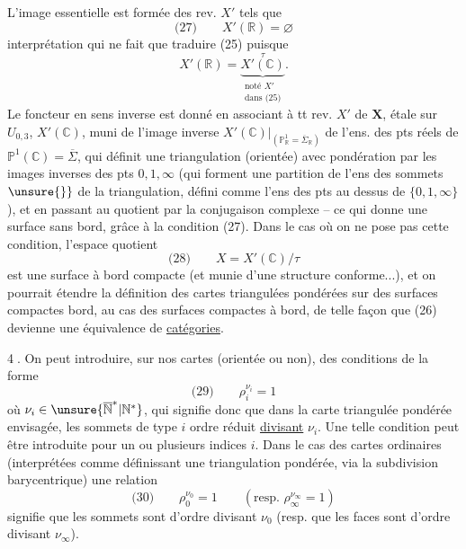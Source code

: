 L'image essentielle est formée des rev. $X'$ tels que 
\[
\text{(27)}\qquad X'(\mathbb R)=\varnothing
\]
interprétation qui ne fait que traduire (25) puisque
\[
X'(\mathbb R)=\underbrace{X'(\mathbb C)}_{\substack{\text{noté }X'\\\text{dans (25)}}}^{\tau}.
\]
Le foncteur en sens inverse est donné en associant à tt rev.  $X'$ de $\mathbf X$, étale sur $U_{0,3}$,  $X'(\mathbb C)$, muni de l'image inverse $\left.X'(\mathbb C)\right|_{(\mathbb P^1_{\mathbb R}=\overline\Sigma_{\mathbb R})}$ de l'ens. des pts réels de $\mathbb P^1(\mathbb C)=\overline\Sigma$,
qui définit une triangulation (orientée) avec pondération par les images inverses des pts $0,1,\infty$ (qui forment  une partition de l'ens des sommets $\unsure{\}}$ de la triangulation, défini comme l'ens des pts au dessus de $\{0,1,\infty\}$), et en passant au quotient par la conjugaison complexe -- ce qui donne une surface sans bord, grâce à la condition (27). Dans le cas où on ne pose pas cette condition, l'espace quotient
\[
\text{(28)}\qquad X=X'(\mathbb C)/\tau
\]
est une surface à bord compacte (et munie d'une structure conforme...), et on pourrait étendre  la définition des cartes  triangulées pondérées sur des surfaces compactes  bord, au cas des surfaces compactes à bord, de telle façon que (26) devienne une équivalence de \uline{catégories}.

\textcircled{4.} On peut introduire, sur nos cartes (orientée ou non), des conditions de la forme
\[
\text{(29)}\qquad \rho_i^{\nu_i}=1
\]
 où $\nu_i\in\unsure{\overline{\mathbb N}^{*}|\mathbb N^{*}}$, qui signifie donc que
dans la carte triangulée pondérée envisagée, les sommets de type $i$  ordre réduit \uline{divisant} $\nu_i$. Une telle condition peut être introduite pour un ou plusieurs indices $i$. Dans le cas des cartes ordinaires (interprétées comme définissant une triangulation pondérée, via la subdivision barycentrique) une relation
\[
\text{(30)}\qquad \rho_0^{\nu_0}=1\qquad(\text{resp. }\rho_\infty^{\nu_\infty}=1)
\]
signifie que les sommets sont d'ordre divisant $\nu_0$ (resp. que les faces sont d'ordre divisant $\nu_\infty$).

